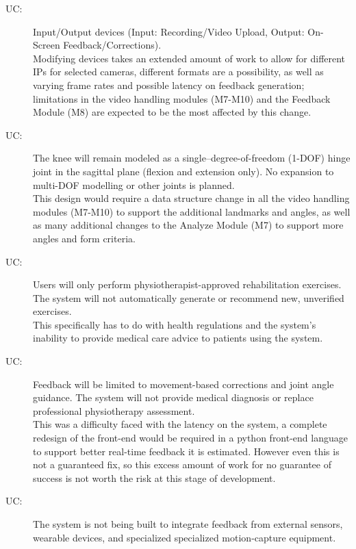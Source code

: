 \documentclass[12pt, titlepage]{article}
\newcounter{ucnum}
\newcommand{\uctheucnum}{UC\theucnum}
\begin{document}
\begin{description}
\item[ \uctheucnum \label{ucIO}:] Input/Output devices
  (Input: Recording/Video Upload, Output: On-Screen Feedback/Corrections). \\
  Modifying devices takes an extended amount of work to allow for different IPs for selected cameras, different formats are a possibility, as well as varying frame rates and possible latency on feedback generation; limitations in the video handling modules (M7-M10) and the Feedback Module (M8) are expected to be the most affected by this change.
\item[ \uctheucnum \label{ucIO}:] The knee will remain modeled as a single–degree-of-freedom (1-DOF) 
hinge joint in the sagittal plane (flexion and extension only). No expansion to multi-DOF modelling or other joints is planned. \\
This design would require a data structure change in all the video handling modules (M7-M10) to support the additional landmarks and angles, as well as many additional changes to the Analyze Module (M7) to support more angles and form criteria.
\item[ \uctheucnum \label{ucIO}:] Users will only perform physiotherapist-approved rehabilitation exercises. 
The system will not automatically generate or recommend new, unverified exercises. \\
This specifically has to do with health regulations and the system's inability to provide medical care advice to patients using the system.
\item[ \uctheucnum \label{ucIO}:] Feedback will be limited to movement-based corrections and joint angle guidance. 
The system will not provide medical diagnosis or replace professional physiotherapy assessment. \\
This was a difficulty faced with the latency on the system, a complete redesign of the front-end would be required in a python front-end language to support better real-time feedback it is estimated. However even this is not a guaranteed fix, so this excess amount of work for no guarantee of success is not worth the risk at this stage of development.
\item[ \uctheucnum \label{ucIO}:] The system is not being built to integrate feedback from external sensors, wearable devices, 
and specialized specialized motion-capture equipment. \\

\end{description}
\end{document}
